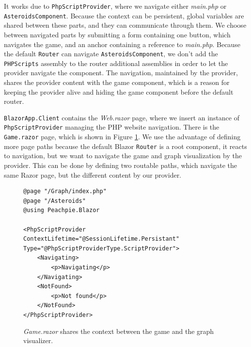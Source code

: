 It works due to \texttt{PhpScriptProvider}, where we navigate either \textit{main.php} or \texttt{AsteroidsCompo\-nent}.
Because the context can be persistent, global variables are shared between these parts, and they can communicate through them.
We choose between navigated parts by submitting a form containing one button, which navigates the game, and an anchor containing a reference to \textit{main.php}.
Because the default \texttt{Router} can navigate \texttt{AsteroidsComponent}, we don't add the \texttt{PHPScripts} assembly to the router additional assemblies in order to let the provider navigate the component.
The navigation, maintained by the provider, shares the provider content with the game component, which is a reason for keeping the provider alive and hiding the game component before the default router.
\par
\texttt{BlazorApp.Client} contains the \textit{Web.razor} page, where we insert an instance of \texttt{PhpScriptProvider} managing the PHP website navigation.
There is the \texttt{Game.razor} page, which is shown in Figure \ref{img29:razor}.
We use the advantage of defining more page paths because the default Blazor \texttt{Router} is a root component, it reacts to navigation, but we want to navigate the game and graph visualization by the provider.
This can be done by defining two routable paths, which navigate the same Razor page, but the different content by our provider.
\par
\begin{figure}[b!]
\begin{lstlisting}
@page "/Graph/index.php"
@page "/Asteroids"
@using Peachpie.Blazor

<PhpScriptProvider ContextLifetime="@SessionLifetime.Persistant" 
Type="@PhpScriptProviderType.ScriptProvider">
    <Navigating>
        <p>Navigating</p>
    </Navigating>
    <NotFound>
        <p>Not found</p>
    </NotFound>
</PhpScriptProvider>
\end{lstlisting}
\caption{\textit{Game.razor} shares the context between the game and the graph visualizer.}
\label{img29:razor}
\end{figure}
